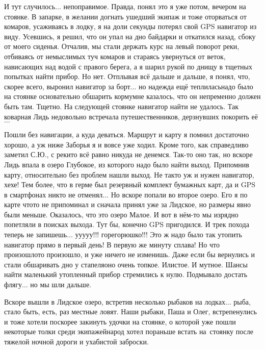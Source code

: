 И тут случилось$\ldots$ непоправимое. Правда, понял это я уже потом, вечером на стоянке. В запарке, в желании догнать ушедший экипаж и тоже оторваться от комаров, усаживаясь в лодку, я на доли секунды потерял свой GPS навигатор из виду. Усевшись, я решил, что он упал на дно байдарки и откатился назад, сбоку от моего сиденья. Отчалив, мы стали держать курс на левый поворот реки, отбиваясь от немыслимых туч комаров и стараясь увернуться от веток, нависающих над водой с правого берега, а я шарил рукой по днищу в тщетных попытках найти прибор. Но нет. Отплывая всё дальше и дальше, я понял, что, скорее всего, выронил навигатор за борт$\ldots$ но надежда ещё теплилась\mdash надо было на стоянке основательно обшарить корму\mdash мне казалось, что он непременно должен быть там. Тщетно. На следующей стоянке навигатор найти не удалось. Так коварная Лидь недовольно встречала путешественников, дерзнувших покорить её$\ldots$

Пошли без навигации, а куда деваться. Маршрут и карту я помнил достаточно хорошо, а уж ниже Заборья я и вовсе уже ходил. Кроме того, как справедливо заметил С.Ю., с реки\sdash то всё равно никуда не денемся. Так-то оно так, но вскоре Лидь впала в озеро Глубокое, из которого надо было найти выход. Припомнив карту, относительно без проблем нашли выход. Не так\sdash то уж и нужен навигатор, хе\sdash хе! Тем более, что в герме был резервный комплект бумажных карт, да и GPS в смартфонах никто не отменял$\ldots$ Но вскоре попали во второе озеро. Его я по карте что\sdash то не припоминал и сначала принял уже за Лидское, но размеры явно были меньше. Оказалось, что это озеро Малое. И вот в нём-то мы изрядно попетляли в поисках выхода. Тут бы, конечно GPS пригодился. И трек похода теперь не запишешь$\ldots$ у\sdash у\sdash у\sdash у\sdash у!!! горе\sdash горюшко!!! Это ж надо было так утопить навигатор прямо в первый день! В первую же минуту сплава! Но что произошло\mdash то произошло, и уже ничего не изменишь. Даже если бы вернулись и стали обшаривать дно у стапеля\mdash оно очень топкое. Илистое. И мутное. Шансы найти маленький утопленный прибор стремились к нулю. Подмывало достать флягу$\ldots$ но мы шли дальше.

Вскоре вышли в Лидское озеро, встретив несколько рыбаков на лодках$\ldots$ рыба, стало быть, есть, раз местные ловят. Наши рыбаки, Паша и Олег, встрепенулись и тоже хотели поскорее закинуть удочки на стоянке, о которой уже пошли некоторые толки среди экипажей\mdash народ хотел пораньше встать на~стоянку после тяжелой ночной дороги и ухабистой заброски. 

